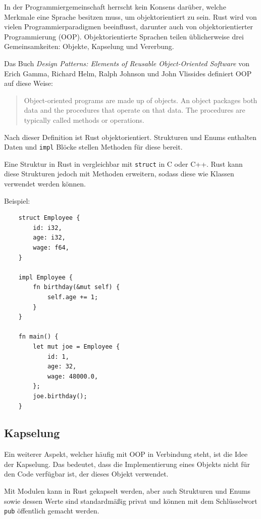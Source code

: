 In der Programmiergemeinschaft herrscht kein Konsens darüber, welche Merkmale eine Sprache besitzen muss, um objektorientiert zu sein. Rust wird von vielen Programmierparadigmen beeinflusst, darunter auch von objektorientierter Programmierung (OOP). Objektorientierte Sprachen teilen üblicherweise drei Gemeinsamkeiten: Objekte, Kapselung und Vererbung.

Das Buch \textit{Design Patterns: Elements of Reusable Object-Oriented Software} von Erich Gamma, Richard Helm, Ralph Johnson und John Vlissides definiert OOP auf diese Weise:

\begin{quote}
    Object-oriented programs are made up of objects. An object packages both data and the procedures that operate on that data. The procedures are typically called methods or operations.
\end{quote}

Nach dieser Definition ist Rust objektorientiert. Strukturen und Enums enthalten Daten und \verb"impl" Blöcke stellen Methoden für diese bereit.

Eine Struktur in Rust in vergleichbar mit \verb"struct" in C oder C++. Rust kann diese Strukturen jedoch mit Methoden erweitern, sodass diese wie Klassen verwendet werden können.

Beispiel:

\begin{lstlisting}
    struct Employee {
        id: i32,
        age: i32,
        wage: f64,
    }
    
    impl Employee {
        fn birthday(&mut self) {
            self.age += 1;
        }
    }
    
    fn main() {
        let mut joe = Employee {
            id: 1,
            age: 32,
            wage: 48000.0,
        };
        joe.birthday();
    }
\end{lstlisting}

\subsection{Kapselung}

Ein weiterer Aspekt, welcher häufig mit OOP in Verbindung steht, ist die Idee der Kapselung. Das bedeutet, dass die Implementierung eines Objekts nicht für den Code verfügbar ist, der dieses Objekt verwendet.

Mit Modulen kann in Rust gekapselt werden, aber auch Strukturen und Enums sowie dessen Werte sind standardmäßig privat und können mit dem Schlüsselwort \verb"pub" öffentlich gemacht werden.

